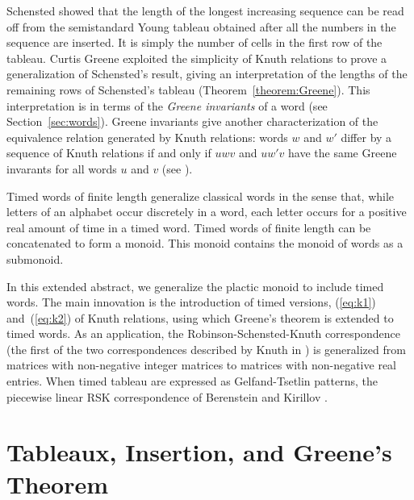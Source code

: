 \documentclass[10pt]{amsproc}
\theoremstyle{definition}
\theoremstyle{remark}
\begin{document}
Schensted showed that the length of the longest increasing sequence can be read off from the semistandard Young tableau obtained after all the numbers in the sequence are inserted.
It is simply the number of cells in the first row of the tableau.
Curtis Greene \cite{Greene-schen} exploited the simplicity of Knuth relations to prove a generalization of Schensted's result, giving an interpretation of the lengths of the remaining rows of Schensted's tableau (Theorem~\ref{theorem:Greene}).
This interpretation is in terms of the \emph{Greene invariants} of a word (see Section~\ref{sec:words}).
Greene invariants give another characterization of the equivalence relation generated by Knuth relations: words $w$ and $w'$ differ by a sequence of Knuth relations if and only if $uwv$ and $uw'v$ have the same Greene invarants for all words $u$ and $v$ (see \cite[Theorem~2.15]{plaxique}).

Timed words of finite length generalize classical words in the sense that, while letters of an alphabet occur discretely in a word, each letter occurs for a positive real amount of time in a timed word.
Timed words of finite length can be concatenated to form a monoid.
This monoid contains the monoid of words as a submonoid.

In this extended abstract, we generalize the plactic monoid to include timed words.
The main innovation is the introduction of timed versions, (\ref{eq:k1}) and~(\ref{eq:k2}) of Knuth relations, using which Greene's theorem is extended to timed words.
As an application, the Robinson-Schensted-Knuth correspondence (the first of the two correspondences described by Knuth in \cite{knuth}) is generalized from matrices with non-negative integer matrices to matrices with non-negative real entries.
When timed tableau are expressed as Gelfand-Tsetlin patterns, the piecewise linear RSK correspondence of Berenstein and Kirillov \cite{kir-trop}.
\section{Tableaux, Insertion, and Greene's Theorem}
\label{sec:tabl-insert-green}
\end{document}
